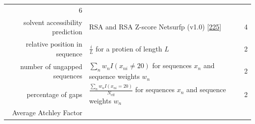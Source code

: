\documentclass[11pt,a4paper,twoside]{book}
\theoremstyle{definition}
\theoremstyle{definition}
\theoremstyle{remark}
\begin{document}
\begin{longtable}[]{@{}rlc@{}}
\begin{minipage}[t]{0.18\columnwidth}
6\strut
\end{minipage}\tabularnewline
\begin{minipage}[t]{0.23\columnwidth}\raggedleft\strut
solvent accessibility prediction\strut
\end{minipage} & \begin{minipage}[t]{0.50\columnwidth}\raggedright\strut
RSA and RSA Z-score Netsurfp (v1.0)
{[}\protect\hyperlink{ref-Petersen2009a}{225}{]}\strut
\end{minipage} & \begin{minipage}[t]{0.18\columnwidth}\centering\strut
4\strut
\end{minipage}\tabularnewline
\begin{minipage}[t]{0.23\columnwidth}\raggedleft\strut
relative position in sequence\strut
\end{minipage} & \begin{minipage}[t]{0.50\columnwidth}\raggedright\strut
\(\frac{i}{L}\) for a protien of length \(L\)\strut
\end{minipage} & \begin{minipage}[t]{0.18\columnwidth}\centering\strut
2\strut
\end{minipage}\tabularnewline
\begin{minipage}[t]{0.23\columnwidth}\raggedleft\strut
number of ungapped sequences\strut
\end{minipage} & \begin{minipage}[t]{0.50\columnwidth}\raggedright\strut
\(\sum_n w_n I(x_{ni} \neq 20)\) for sequences \(x_n\) and sequence
weights \(w_n\)\strut
\end{minipage} & \begin{minipage}[t]{0.18\columnwidth}\centering\strut
2\strut
\end{minipage}\tabularnewline
\begin{minipage}[t]{0.23\columnwidth}\raggedleft\strut
percentage of gaps\strut
\end{minipage} & \begin{minipage}[t]{0.50\columnwidth}\raggedright\strut
\(\frac{\sum_n w_n I(x_{ni} = 20)}{N_{\text{eff}}}\) for sequences
\(x_n\) and sequence weights \(w_n\)\strut
\end{minipage} & \begin{minipage}[t]{0.18\columnwidth}\centering\strut
2\strut
\end{minipage}\tabularnewline
\begin{minipage}[t]{0.23\columnwidth}\raggedleft\strut
Average Atchley Factor\strut
\end{minipage} & \begin{minipage}[t]{0.50\columnwidth}\raggedright\strut

\end{minipage}
\end{longtable}
\end{document}
